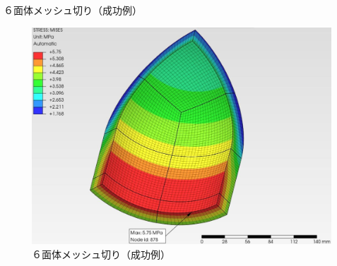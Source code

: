 \begin{frame}{６面体メッシュ切り（成功例）}
 
\begin{figure}[htbp]
\begin{center}
\includegraphics[keepaspectratio,scale=1.0]{work/images/fig02.jpg}
\caption{６面体メッシュ切り（成功例）}
\end{center}
\end{figure}
 
\end{frame}
